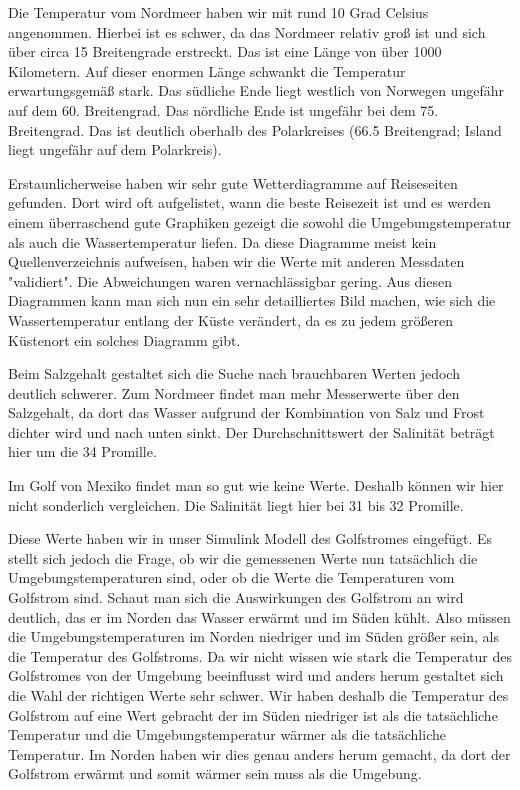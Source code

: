 \documentclass[a4paper,twoside]{article}
\begin{document}
	Die Temperatur vom Nordmeer haben wir mit rund 10 Grad Celsius angenommen. Hierbei ist es schwer, da das Nordmeer relativ groß ist und sich über circa 15 Breitengrade erstreckt. Das ist eine Länge von über 1000 Kilometern. Auf dieser enormen Länge schwankt die Temperatur erwartungsgemäß stark. Das südliche Ende liegt westlich von Norwegen ungefähr auf dem 60. Breitengrad. Das nördliche Ende ist ungefähr bei dem 75. Breitengrad. Das ist deutlich oberhalb des Polarkreises (66.5 Breitengrad; Island liegt ungefähr auf dem Polarkreis).

	Erstaunlicherweise haben wir sehr gute Wetterdiagramme auf Reiseseiten gefunden. Dort wird oft aufgelistet, wann die beste Reisezeit ist und es werden einem überraschend gute Graphiken gezeigt die sowohl die Umgebungstemperatur als auch die Wassertemperatur liefen. Da diese Diagramme meist kein Quellenverzeichnis aufweisen, haben wir die Werte mit anderen Messdaten "validiert". Die Abweichungen waren vernachlässigbar gering. Aus diesen Diagrammen kann man sich nun ein sehr detailliertes Bild machen, wie sich die Wassertemperatur entlang der Küste verändert, da es zu jedem größeren Küstenort ein solches Diagramm gibt.

	Beim Salzgehalt gestaltet sich die Suche nach brauchbaren Werten jedoch deutlich schwerer. Zum Nordmeer findet man mehr Messerwerte über den Salzgehalt, da dort das Wasser aufgrund der Kombination von Salz und Frost dichter wird und nach unten sinkt. Der Durchschnittswert der Salinität beträgt hier um die 34 Promille. 

	Im Golf von Mexiko findet man so gut wie keine Werte. Deshalb können wir hier nicht sonderlich vergleichen. Die Salinität liegt hier bei 31 bis 32 Promille.

	Diese Werte haben wir in unser Simulink Modell des Golfstromes eingefügt. Es stellt sich jedoch die Frage, ob wir die gemessenen Werte nun tatsächlich die Umgebungstemperaturen sind, oder ob die Werte die Temperaturen vom Golfstrom sind. Schaut man sich die Auswirkungen des Golfstrom an wird deutlich, das er im Norden das Wasser erwärmt und im Süden kühlt. Also müssen die Umgebungstemperaturen im Norden niedriger und im Süden größer sein, als die Temperatur des Golfstroms. Da wir nicht wissen wie stark die Temperatur des Golfstromes von der Umgebung beeinflusst wird und anders herum gestaltet sich die Wahl der richtigen Werte sehr schwer. Wir haben deshalb die Temperatur des Golfstrom auf eine Wert gebracht der im Süden niedriger ist als die tatsächliche Temperatur und die Umgebungstemperatur wärmer als die tatsächliche Temperatur. Im Norden haben wir dies genau anders herum gemacht, da dort der Golfstrom erwärmt und somit wärmer sein muss als die Umgebung.
	
\end{document}
